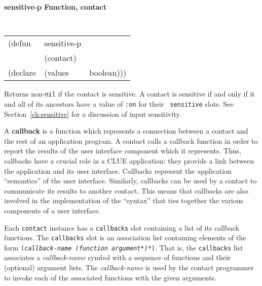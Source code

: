 {\samepage
{\large {\bf sensitive-p \hfill Function, contact}} 
\begin{flushright} \parbox[t]{6.125in}{
\tt
\begin{tabular}{lll}
\raggedright
(defun & sensitive-p & \\ 
& (contact) \\
(declare &(values  & boolean)))
\end{tabular}
\rm

}\end{flushright}}

\begin{flushright} \parbox[t]{6.125in}{
Returns non-{\tt nil} if the contact is sensitive. 
A contact is sensitive if and
only if it and all of its ancestors have a value  of {\tt :on} for their {\tt
sensitive} slots.
See
Section~\ref{ch:sensitive} for a discussion of input sensitivity.

}\end{flushright}




A {\bf callback} is a function which represents a connection
between a contact and the rest of an application program. A contact calls a
callback function in order to report the results of the user interface component
which it represents. Thus, callbacks have a crucial role in a CLUE application:
they provide a link between the application and its user interface. Callbacks
represent the application ``semantics'' of the user interface.
Similarly, callbacks can be used by a contact to communicate its results to
another contact. This means that callbacks are also involved in the
implementation of the ``syntax'' that ties together the various components of a
user interface. 

Each {\tt contact} instance has a {\tt callbacks} slot containing a list of its
callback functions.  The {\tt callbacks} slot is an association list containing
elements of the form 
{\tt ({\em callback-name (function argument*)*})}.
That is, the {\tt callbacks} list associates a {\em callback-name} symbol with a
sequence of functions and their (optional) argument lists.  The {\em
callback-name} is used by the contact programmer to invoke each of the
associated functions with the given arguments.

